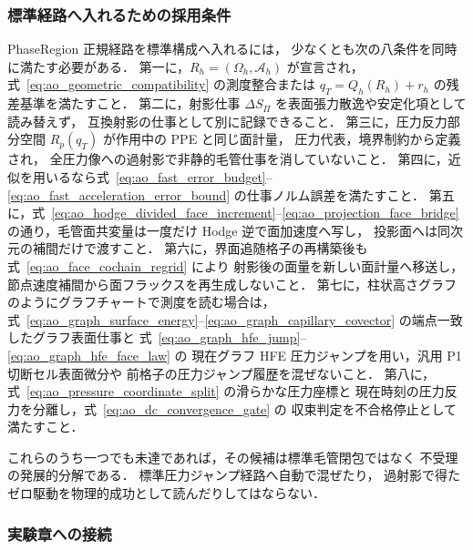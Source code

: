 \subsubsection{標準経路へ入れるための採用条件}
\label{sec:ao_admission_conditions}

PhaseRegion 正規経路を標準構成へ入れるには，
少なくとも次の八条件を同時に満たす必要がある．
第一に，$R_h=(\Omega_h,\mathcal{A}_h)$ が宣言され，
式~\eqref{eq:ao_geometric_compatibility} の測度整合または
$q_T=Q_h(R_h)+r_h$ の残差基準を満たすこと．
第二に，射影仕事 $\Delta S_\Pi$ を表面張力散逸や安定化項として読み替えず，
互換射影の仕事として別に記録できること．
第三に，圧力反力部分空間 $R_p(q_T)$ が作用中の PPE と同じ面計量，
圧力代表，境界制約から定義され，
全圧力像への過射影で非静的毛管仕事を消していないこと．
第四に，近似を用いるなら式~\eqref{eq:ao_fast_error_budget}--\eqref{eq:ao_fast_acceleration_error_bound}
の仕事ノルム誤差を満たすこと．
第五に，式~\eqref{eq:ao_hodge_divided_face_increment}--\eqref{eq:ao_projection_face_bridge}
の通り，毛管面共変量は一度だけ Hodge 逆で面加速度へ写し，
投影面へは同次元の補間だけで渡すこと．
第六に，界面追随格子の再構築後も式~\eqref{eq:ao_face_cochain_regrid} により
射影後の面量を新しい面計量へ移送し，節点速度補間から面フラックスを再生成しないこと．
第七に，柱状高さグラフのようにグラフチャートで測度を読む場合は，
式~\eqref{eq:ao_graph_surface_energy}--\eqref{eq:ao_graph_capillary_covector}
の端点一致したグラフ表面仕事と
式~\eqref{eq:ao_graph_hfe_jump}--\eqref{eq:ao_graph_hfe_face_law} の
現在グラフ HFE 圧力ジャンプを用い，汎用 P1 切断セル表面微分や
前格子の圧力ジャンプ履歴を混ぜないこと．
第八に，式~\eqref{eq:ao_pressure_coordinate_split} の滑らかな圧力座標と
現在時刻の圧力反力を分離し，式~\eqref{eq:ao_dc_convergence_gate} の
収束判定を不合格停止として満たすこと．

これらのうち一つでも未達であれば，その候補は標準毛管閉包ではなく
不受理の発展的分解である．
標準圧力ジャンプ経路へ自動で混ぜたり，
過射影で得たゼロ駆動を物理的成功として読んだりしてはならない．

\subsubsection{実験章への接続}
\label{sec:ao_fast_validation_connection}


